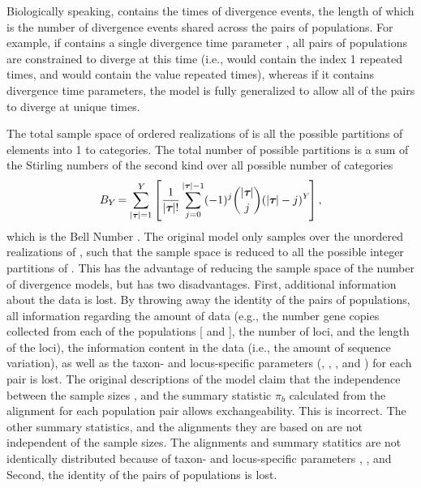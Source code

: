 \documentclass[letterpaper,12pt]{article}
\begin{document}
\begin{linenumbers}
Biologically speaking, \divTimeVector contains the times of divergence events,
the length of which \divTimeNum is the number of divergence events shared across
the \npairs{} pairs of populations.
For example, if \divTimeVector contains a single divergence time parameter
, all \npairs{} pairs of populations are constrained to diverge at
this time (i.e., \divTimeIndexVector would contain the index 1 repeated
\npairs{} times, and \divTimeMapVector would contain the value 
repeated \npairs{} times), whereas if it contains \npairs{} divergence time
parameters, the model is fully generalized to allow all of the pairs to diverge
at unique times.

\begin{linenomath}
The total sample space of ordered realizations of \divTimeMapVector is all the
possible partitions of \npairs{} elements into 1 to \npairs{} categories.
The total number of possible partitions is a sum of the Stirling numbers of
the second kind over all possible number of categories \divTimeNum
\begin{equation}
    B_{Y_{}}=\sum_{\lvert \boldsymbol{\tau_{}} \rvert=1}^{Y_{}} \left[
    \frac{1}{\lvert \boldsymbol{\tau_{}} \rvert!} \sum_{j=0}^{\lvert \boldsymbol{\tau_{}} \rvert-1} (-1)^{j}
    \binom{\lvert \boldsymbol{\tau_{}} \rvert}{j} (\lvert \boldsymbol{\tau_{}} \rvert-j)^{Y_{}} \right],
    \label{eq:bell}
\end{equation}
which is the Bell Number \citep{Bell1934}.
The original \msb model only samples over the unordered realizations of
\divTimeIndexVector, such that the sample space is reduced to all the possible
integer partitions of \npairs{} \citep{Oaks2012,OeisPartitionNumber,
    OeisPartitionTriangle,Malenfant2011}.
This has the advantage of reducing the sample space of the number of
divergence models, but has two disadvantages.
First, additional information about the data is lost.
By throwing away the identity of the \npairs{} pairs of populations, all
information regarding the amount of data (e.g., the number gene copies
collected from each of the populations [ and
], the number of loci, and the length of the loci), the
information content in the data (i.e., the amount of sequence variation), as
well as the taxon- and locus-specific parameters (\hkyModel{}{},
\mutationRateScalarConstant{}{}, \ploidyScalar{}{}, and
\locusMutationRateScalar{}) for each pair is lost.
The original descriptions of the \msb model claim that the independence
between the sample sizes ,  and
the summary statistic $\pi_b$ calculated from the alignment for each
population pair allows exchangeability.
This is incorrect.
The other summary statistics, and the alignments they are based on are
not independent of the sample sizes.
The alignments and summary statitics are not identically distributed because of
taxon- and locus-specific parameters \hkyModel{}{},
\mutationRateScalarConstant{}{}, and \ploidyScalar{}{}
Second, the identity of the pairs of populations is lost.
\end{linenomath}


\end{linenumbers}
\end{document}
